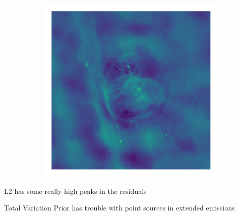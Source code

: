 \begin{figure}[h]
\begin{subfigure}[b]{0.3\linewidth}
	\end{subfigure}
	\begin{subfigure}[b]{0.3\linewidth}
		\includegraphics[width=\linewidth, trim={18px 19px 18px 18px}, clip]{./chapters/05.results/g55/TV_residual.png}
	\end{subfigure}
\end{figure}

L2 has some really high peaks in the residuals

Total Variation Prior has trouble with point sources in extended emissions

